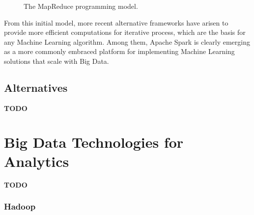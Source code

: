 \documentclass[3p,review]{elsarticle}
\newcommand{\TODO}{\textbf{TODO}}
\begin{document}
\begin{figure}[!ht]
\centering {} \caption{The MapReduce programming model.}
\label{fig:mapreduce}
\end{figure}

From this initial model, more recent alternative frameworks have arisen to provide more efficient computations for iterative process, which are the basis for any Machine Learning algorithm. Among them, Apache Spark \cite{Zaharia12,Zaharia10} is clearly emerging as a more commonly embraced platform for implementing Machine Learning solutions that scale with Big Data.

\subsection{Alternatives}\label{subsec:altMR}

\TODO

\section{Big Data Technologies for Analytics}\label{sec:techno}

\TODO

\subsubsection{Hadoop}\label{subsec:hadoop}
\end{document}
